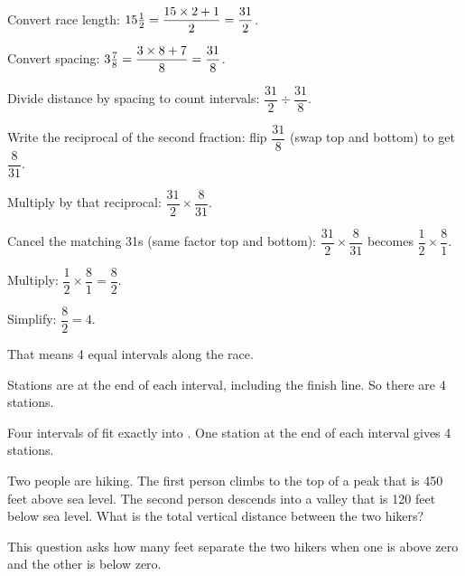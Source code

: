\begin{steps}
  \item Convert race length: $15\tfrac{1}{2} = \dfrac{15 \times 2 + 1}{2} = \dfrac{31}{2}$.
  \item Convert spacing: $3\tfrac{7}{8} = \dfrac{3 \times 8 + 7}{8} = \dfrac{31}{8}$.
  \item Divide distance by spacing to count intervals: $\dfrac{31}{2} \div \dfrac{31}{8}$.
  \item Write the reciprocal of the second fraction: flip $\dfrac{31}{8}$ (swap top and bottom) to get $\dfrac{8}{31}$.
  \item Multiply by that reciprocal: $\dfrac{31}{2} \times \dfrac{8}{31}$.
  \item Cancel the matching 31s (same factor top and bottom): $\dfrac{31}{2} \times \dfrac{8}{31}$ becomes $\dfrac{1}{2} \times \dfrac{8}{1}$.
  \item Multiply: $\dfrac{1}{2} \times \dfrac{8}{1} = \dfrac{8}{2}$.
  \item Simplify: $\dfrac{8}{2} = 4$.
  \item That means 4 equal intervals along the race.
  \item Stations are at the end of each interval, including the finish line. So there are 4 stations.
\end{steps}


Four intervals of  fit exactly into . One station at
the end of each interval gives 4 stations.



Two people are hiking. The first person climbs to the top of a peak that is 450
feet above sea level. The second person descends into a valley that is 120 feet
below sea level. What is the total vertical distance between the two hikers?


This question asks how many feet separate the two hikers when one is above zero
and the other is below zero.

